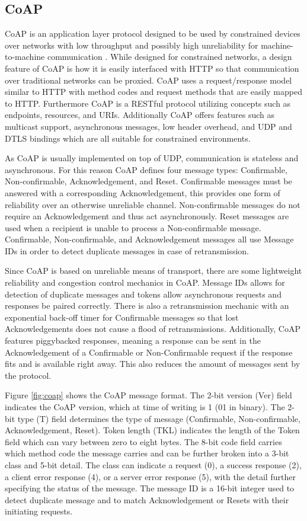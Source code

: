 \documentclass[0-thesis.tex]{subfiles}
\begin{document}
\subsection{CoAP}
\label{ssec:coap}
CoAP is an application layer protocol designed to be used by constrained devices over
networks with low throughput and possibly high unreliability for machine-to-machine
communication \parencite{rfc7252}. While designed for constrained networks, a design
feature of CoAP is how it is easily interfaced with HTTP so that communication over
traditional networks can be proxied. CoAP uses a request/response model similar to HTTP
with method codes and request methods that are easily mapped to HTTP. Furthermore CoAP is
a RESTful protocol utilizing concepts such as endpoints, resources, and URIs. Additionally
CoAP offers features such as multicast support, asynchronous messages, low header
overhead, and UDP and DTLS bindings which are all suitable for constrained environments.

As CoAP is usually implemented on top of UDP, communication is stateless and asynchronous.
For this reason CoAP defines four message types: Confirmable, Non-confirmable,
Acknowledgement, and Reset. Confirmable messages must be answered with a corresponding
Acknowledgement, this provides one form of reliability over an otherwise unreliable
channel. Non-confirmable messages do not require an Acknowledgement and thus act
asynchronously. Reset messages are used when a recipient is unable to process a
Non-confirmable message. Confirmable, Non-confirmable, and Acknowledgement messages all
use Message IDs in order to detect duplicate messages in case of retransmission.

Since CoAP is based on unreliable means of transport, there are some lightweight
reliability and congestion control mechanics in CoAP. Message IDs allows for detection of
duplicate messages and tokens allow asynchronous requests and responses be paired
correctly. There is also a retransmission mechanic with an exponential back-off timer for
Confirmable messages so that lost Acknowledgements does not cause a flood of
retransmissions. Additionally, CoAP features piggybacked responses, meaning a response can
be sent in the Acknowledgement of a Confirmable or Non-Confirmable request if the response
fits and is available right away. This also reduces the amount of messages sent by the
protocol.

Figure \ref{fig:coap} shows the CoAP message format. The 2-bit version (Ver) field
indicates the CoAP version, which at time of writing is 1 (01 in binary). The 2-bit type
(T) field determines the type of message (Confirmable, Non-confirmable, Acknowledgement,
Reset). Token length (TKL) indicates the length of the Token field which can vary between
zero to eight bytes. The 8-bit code field carries which method code the message carries
and can be further broken into a 3-bit class and 5-bit detail. The class can indicate a
request (0), a success response (2), a client error response (4), or a server error
response (5), with the detail further specifying the status of the message. The message ID
is a 16-bit integer used to detect duplicate message and to match Acknowledgement or
Resets with their initiating requests.
\end{document}
